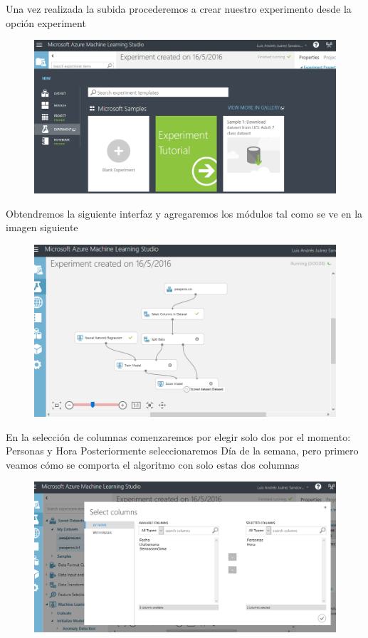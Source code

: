 \documentclass[11pt]{article}
\begin{document}
Una vez realizada la subida procederemos a crear nuestro experimento desde la opción experiment\\

\begin{figure}[htp]
\centering
\includegraphics[width=12cm]{1.jpg}
\label{fig:lion}
\end{figure}


Obtendremos la siguiente interfaz y agregaremos los módulos tal como se ve en la imagen siguiente\\

\begin{figure}[htp]
\centering
\includegraphics[width=12cm]{4.jpg}
\label{fig:lion}
\end{figure}


En la selección de columnas comenzaremos por elegir solo dos por el momento: Personas y Hora 
Posteriormente seleccionaremos Día de la semana, pero primero veamos cómo se comporta el algoritmo con solo estas dos columnas

\begin{figure}[htp]
\centering
\includegraphics[width=12cm]{5.jpg}
\label{fig:lion}
\end{figure}
\end{document}
